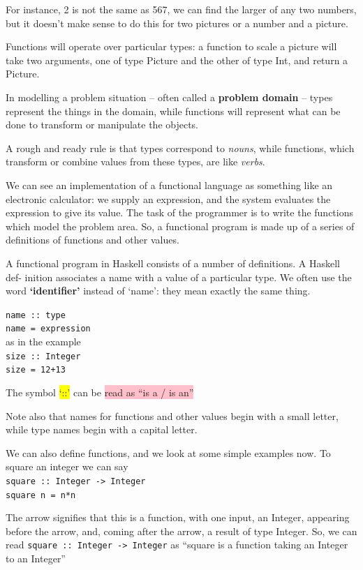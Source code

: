 \documentclass[tikz,border=10pt]{project_plan}
\begin{document}
For instance, 2 is not the same as 567, we can find the larger of any two numbers,
but it doesn’t make sense to do this for two pictures or a number and a picture.

Functions will operate over particular types: a function to scale a picture will
take two arguments, one of type Picture and the other of type Int, and return a
Picture.

In modelling a problem situation – often called a \textbf{problem domain} – types represent
the things in the domain, while functions will represent what can be done to
transform or manipulate the objects.

A rough and ready rule is that types correspond to \textit{nouns}, while functions, which
transform or combine values from these types, are like \textit{verbs}.

We can see an implementation of a functional
language as something like an electronic calculator: we supply an expression, and
the system evaluates the expression to give its value. The task of the programmer is
to write the functions which model the problem area.
So, a functional program is made up of a series of definitions of functions and
other values.

A functional program in Haskell consists of a number of definitions. A Haskell def-
inition associates a name with a value of a particular type. We often use the word
\textbf{‘identifier’} instead of ‘name’: they mean exactly the same thing.

\lstinline[columns=fixed]|name :: type|\\
\lstinline[columns=fixed]|name = expression|\\
as in the example\\
\lstinline[columns=fixed]|size :: Integer|\\
\lstinline[columns=fixed]|size = 12+13|

The symbol \colorbox{yellow}{‘::’} can be \colorbox{pink}{read as “is a / is an”}

Note also that names for functions and other values begin with a small letter, while type names begin with a capital
letter.

We can also define functions, and we look at some simple examples now. To square
an integer we can say\\
\lstinline[columns=fixed]|square :: Integer -> Integer|\\
\lstinline[columns=fixed]|square n = n*n|

The arrow \textrightarrow signifies that this is a function, with one input, an Integer,
appearing before the arrow, and, coming after the arrow, a result of type Integer.
So, we can read \lstinline[columns=fixed]|square :: Integer -> Integer| as
“square is a function taking an Integer to an Integer”
\end{document}
